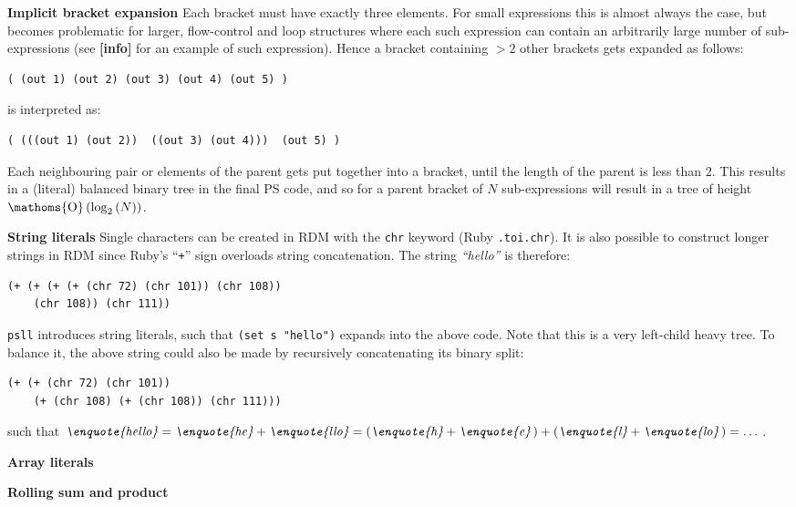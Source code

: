 \documentclass[aip,jcp,reprint]{revtex4-1}
\DeclareMathOperator{\bigO}{\ensuremath{\mathoms{O}}}
\newcommand\plinfo{{\color[rgb]{0.929,0.694,0.125}\textbf{[info]}}\xspace}
\let\tt\texttt
\newcommand\psll{\texttt{psll}\xspace}
\newcommand{\ilpsll}[1]{\lstinline[language=psll,columns=flexible]{#1}}
\begin{document}
\textbf{Implicit bracket expansion} Each bracket must have exactly three elements. For small expressions this is almost always the case, but becomes problematic for larger, flow-control and loop structures where each such expression can contain an arbitrarily large number of sub-expressions (see \plinfo for an example of such expression). Hence a bracket containing $>2$ other brackets gets expanded as follows:
\begin{lstlisting}[language=psll,aboveskip=3pt,belowskip=-2pt]
( (out 1) (out 2) (out 3) (out 4) (out 5) )
\end{lstlisting}
is interpreted as:
\begin{lstlisting}[language=psll,aboveskip=3pt,belowskip=-2pt]
( (((out 1) (out 2))  ((out 3) (out 4)))  (out 5) )
\end{lstlisting}
Each neighbouring pair or elements of the parent gets put together into a bracket, until the length of the parent is less than 2. This results in a (literal) balanced binary tree in the final PS code, and so for a parent bracket of $N$ sub-expressions will result in a tree of height $\bigO\left(\log_2\left(N\right)\right)$.

\textbf{String literals} Single characters can be created in RDM with the \tt{chr} keyword (Ruby \tt{.to\textunderscore{}i.chr}). It is also possible to construct longer strings in RDM since Ruby's \enquote{\tt{+}} sign overloads string concatenation. The string \textit{\enquote{hello}} is therefore:
\begin{lstlisting}[language=psll,aboveskip=3pt,belowskip=-2pt]
(+ (+ (+ (+ (chr 72) (chr 101)) (chr 108))
	(chr 108)) (chr 111))
\end{lstlisting}
\psll introduces string literals, such that \ilpsll{(set s "hello")} expands into the above code. Note that this is a very left-child heavy tree. To balance it, the above string could also be made by recursively concatenating its binary split:
\begin{lstlisting}[language=psll,aboveskip=3pt,belowskip=-2pt]
(+ (+ (chr 72) (chr 101))
	(+ (chr 108) (+ (chr 108)) (chr 111)))
\end{lstlisting}
such that $\textit{\enquote{hello}} = \textit{\enquote{he}} + \textit{\enquote{llo}} = \left(\textit{\enquote{h}} + \textit{\enquote{e}}\,\right) + \left(\textit{\enquote{l}} + \textit{\enquote{lo}}\,\right) = \dots$.

\textbf{Array literals}

\textbf{Rolling sum and product}
\end{document}
